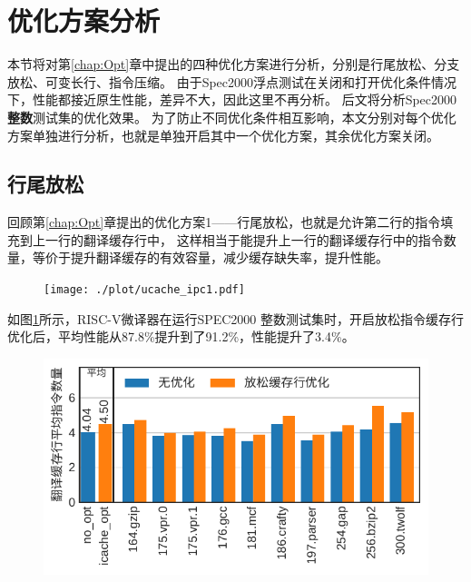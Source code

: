 \section{优化方案分析}

本节将对第\ref{chap:Opt}章中提出的四种优化方案进行分析，分别是行尾放松、分支放松、可变长行、指令压缩。
由于Spec2000浮点测试在关闭和打开优化条件情况下，性能都接近原生性能，差异不大，因此这里不再分析。
后文将分析Spec2000\textbf{整数}测试集的优化效果。
为了防止不同优化条件相互影响，本文分别对每个优化方案单独进行分析，也就是单独开启其中一个优化方案，其余优化方案关闭。

\subsection{行尾放松}

回顾第\ref{chap:Opt}章提出的优化方案1——行尾放松，也就是允许第二行的指令填充到上一行的翻译缓存行中，
这样相当于能提升上一行的翻译缓存行中的指令数量，等价于提升翻译缓存的有效容量，减少缓存缺失率，提升性能。

\begin{figure}[!htbp]
  \centering
  \texttt{[image: ./plot/ucache\_ipc1.pdf]}
  \label{img:ipc1}
\end{figure}

如图\ref{img:ipc1}所示，RISC-V微译器在运行SPEC2000 整数测试集时，开启放松指令缓存行优化后，平均性能从87.8\%提升到了91.2\%，性能提升了3.4\%。

\begin{figure}[!htbp]
  \centering
  \includegraphics[width=0.8\linewidth]{./plot/ucacheline_nums1.pdf}
  \label{img:ucacheline_nums1}
\end{figure}



